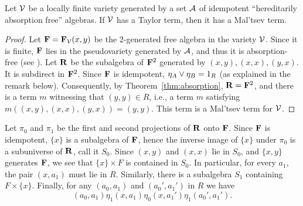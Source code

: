 \begin{theorem}
  Let $\mathcal{V}$ be a locally finite variety generated by a set $\mathcal{A}$ of
  idempotent ``hereditarily absorption free'' algebras.
  If $\mathcal{V}$ has a Taylor term, then it has a Mal'tsev term.
\end{theorem}
\begin{proof}
  Let $\mathbf{F} = \mathbf{F}_{\mathcal{V}}(x,y)$ be the 2-generated free algebra
  in the variety $\mathcal{V}$. Since it is
  finite, $\mathbf{F}$ lies in the pseudovariety generated by $\mathcal{A}$, and thus it is
  absorption-free (see \cite[Proposition 2.1.(1)]{MR3374664}).
  Let $\mathbf{R}$ be the subalgebra of $\mathbf{F}^2$ generated by
  $(x, y), (x, x), (y, x)$. It is subdirect in $\mathbf{F}^2$.
  Since $\mathbf{F}$ is idempotent, $\eta_A \vee \eta_B = 1_R$
  (as explained in the remark %
  below).
  Consequently, by Theorem~\ref{thm:absorption},
  $\mathbf{R} = \mathbf{F}^2$, and there is a term $m$ witnessing
  that $(y, y) \in R$, i.e., a term $m$ satisfying
  $m((x, y), (x, x), (y, x)) = (y, y)$. This
  term is a Mal'tsev term for $\mathcal{V}$.
\end{proof}

\begin{remark}
  \label{rem:absorpt-theor-bk}
  Let $\pi_0$ and $\pi_1$ be the first and second projections of $\mathbf{R}$ onto $\mathbf{F}$.
  Since $\mathbf{F}$ is idempotent, $\{x\}$ is a subalgebra of $\mathbf{F}$, hence the inverse
  image of $\{x\}$ under $\pi_0$ is a subuniverse of $\mathbf{R}$, call it $S_0$.
  Since $(x,y)$ and $(x,x)$ lie in $S_0$, and $\{x,y\}$
  generates $\mathbf{F}$, we see that $\{x\}\times F$ is contained in $S_0$.
  In particular, for every $a_1$, the pair $(x,a_1)$ must lie in $R$.
  Similarly, there is a subalgebra $S_1$ containing
  $F\times \{x\}$. %
  Finally, for any $(a_0,a_1)$ and $(a_0',a_1')$ in $R$ we have
  \[
  (a_0,a_1) \mathrel{\eta_1} (x,a_1) \mathrel{\eta_0} (x,a_1') \mathrel{\eta_1} (a_0',a_1').
  \]
\end{remark}








